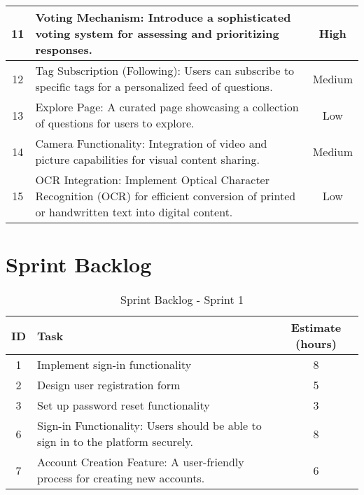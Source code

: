 \begin{table}[h]
\begin{tabular}{|c|p{8cm}|c|}
        \hline
        11 & Voting Mechanism: Introduce a sophisticated voting system for assessing and prioritizing responses. & High \\
        \hline
        12 & Tag Subscription (Following): Users can subscribe to specific tags for a personalized feed of questions. & Medium \\
        \hline
        13 & Explore Page: A curated page showcasing a collection of questions for users to explore. & Low \\
        \hline
        14 & Camera Functionality: Integration of video and picture capabilities for visual content sharing. & Medium \\
        \hline
        15 & OCR Integration: Implement Optical Character Recognition (OCR) for efficient conversion of printed or handwritten text into digital content. & Low \\
        \hline
    \end{tabular}
\end{table}


\section{Sprint Backlog}\label{sprint_backlog}

\begin{table}[h]
    \centering
    \caption*{Sprint Backlog - Sprint 1}
    \begin{tabular}{|c|p{5cm}|c|}
        \hline
        \textbf{ID} & \textbf{Task} & \textbf{Estimate (hours)} \\
        \hline
        1 & Implement sign-in functionality & 8 \\
        \hline
        2 & Design user registration form & 5 \\
        \hline
        3 & Set up password reset functionality & 3 \\
        \hline
        6 & Sign-in Functionality: Users should be able to sign in to the platform securely. & 8 \\
        \hline
        7 & Account Creation Feature: A user-friendly process for creating new accounts. & 6 \\
        \hline
    \end{tabular}
\end{table}

